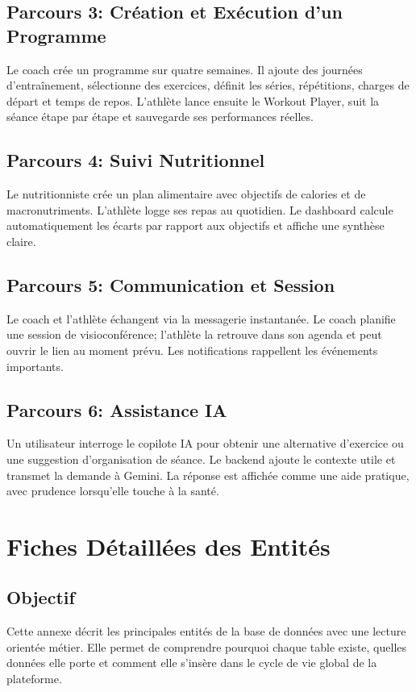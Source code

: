 \section{Parcours 3: Création et Exécution d'un Programme}
Le coach crée un programme sur quatre semaines. Il ajoute des journées d'entraînement, sélectionne des exercices, définit les séries, répétitions, charges de départ et temps de repos. L'athlète lance ensuite le Workout Player, suit la séance étape par étape et sauvegarde ses performances réelles.

\section{Parcours 4: Suivi Nutritionnel}
Le nutritionniste crée un plan alimentaire avec objectifs de calories et de macronutriments. L'athlète logge ses repas au quotidien. Le dashboard calcule automatiquement les écarts par rapport aux objectifs et affiche une synthèse claire.

\section{Parcours 5: Communication et Session}
Le coach et l'athlète échangent via la messagerie instantanée. Le coach planifie une session de visioconférence; l'athlète la retrouve dans son agenda et peut ouvrir le lien au moment prévu. Les notifications rappellent les événements importants.

\section{Parcours 6: Assistance IA}
Un utilisateur interroge le copilote IA pour obtenir une alternative d'exercice ou une suggestion d'organisation de séance. Le backend ajoute le contexte utile et transmet la demande à Gemini. La réponse est affichée comme une aide pratique, avec prudence lorsqu'elle touche à la santé.

\chapter{Fiches Détaillées des Entités}
\minitoc
\newpage

\section{Objectif}
Cette annexe décrit les principales entités de la base de données avec une lecture orientée métier. Elle permet de comprendre pourquoi chaque table existe, quelles données elle porte et comment elle s'insère dans le cycle de vie global de la plateforme.

